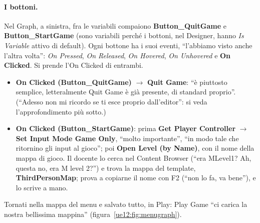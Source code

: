 \paragraph{I bottoni.} Nel Graph, a sinistra, fra le variabili compaiono
\textbf{Button\_QuitGame} e \textbf{Button\_StartGame} (sono variabili perché i bottoni,
nel Designer, hanno \emph{Is Variable} attivo di default). Ogni bottone ha i suoi eventi,
``l'abbiamo visto anche l'altra volta'': \emph{On Pressed}, \emph{On Released},
\emph{On Hovered}, \emph{On Unhovered} e \textbf{On Clicked}. Si prende l'On Clicked di
entrambi.
\begin{itemize}
  \item \textbf{On Clicked (Button\_QuitGame)} $\rightarrow$ \textbf{Quit Game}: ``è
        piuttosto semplice, letteralmente Quit Game è già presente, di standard
        proprio''. (``Adesso non mi ricordo se ti esce proprio dall'editor'': si veda
        l'approfondimento più sotto.)
  \item \textbf{On Clicked (Button\_StartGame)}: prima \textbf{Get Player Controller}
        $\rightarrow$ \textbf{Set Input Mode Game Only}, ``molto importante'', ``in modo
        tale che ritornino gli input al gioco''; poi \textbf{Open Level (by Name)}, con il
        nome della mappa di gioco. Il docente lo cerca nel Content Browser (``era
        MLevel1? Ah, questa no, era M level 2?'') e trova la mappa del template,
        \textbf{ThirdPersonMap}; prova a copiarne il nome con F2 (``non lo fa, va bene''),
        e lo scrive a mano.
\end{itemize}
Tornati nella mappa del menu e salvato tutto, in Play: Play Game ``ci carica la nostra
bellissima mappina'' (figura~\ref{ue12:fig:menugraph}).

